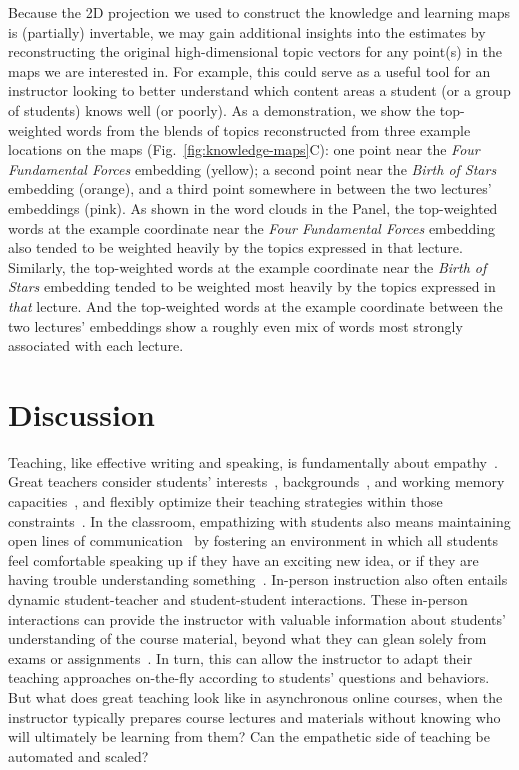 \documentclass[10pt]{article}
\begin{document}
Because the 2D projection we used to construct the knowledge and learning maps
is (partially) invertable, we may gain additional insights into the estimates
by reconstructing the original high-dimensional topic vectors for any point(s)
in the maps we are interested in. For example, this could serve as a useful
tool for an instructor looking to better understand which content areas a
student (or a group of students) knows well (or poorly). As a demonstration, we
show the top-weighted words from the blends of topics reconstructed from three
example locations on the maps (Fig.~\ref{fig:knowledge-maps}C): one point near
the \textit{Four Fundamental Forces} embedding (yellow); a second point near
the \textit{Birth of Stars} embedding (orange), and a third point somewhere in
between the two lectures' embeddings (pink). As shown in the word clouds in the
Panel, the top-weighted words at the example coordinate near the \textit{Four
Fundamental Forces} embedding also tended to be weighted heavily by the topics
expressed in that lecture. Similarly, the top-weighted words at the example
coordinate near the \textit{Birth of Stars} embedding tended to be weighted
most heavily by the topics expressed in \textit{that} lecture. And the
top-weighted words at the example coordinate between the two lectures'
embeddings show a roughly even mix of words most strongly associated with each
lecture.

\section*{Discussion}



Teaching, like effective writing and speaking, is fundamentally about
empathy~\citep{AldrEtal22, StojEtal12, MeyeEtal19}. Great teachers consider
students' interests~\citep{SwarEtal12, Clar10}, backgrounds~\citep{MuijReyn10,
Rose76, denBEtal10}, and working memory capacities~\citep{Allo12}, and flexibly
optimize their teaching strategies within those constraints~\citep{GoodEtal07,
AndeEtal21, John02}. In the classroom, empathizing with students also means
maintaining open lines of communication~\citep{WulfWulf10} by fostering an
environment in which all students feel comfortable speaking up if they have an
exciting new idea, or if they are having trouble understanding
something~\citep{TurnBrai15, GarrRasm14}. In-person instruction also often
entails dynamic student-teacher and student-student interactions. These
in-person interactions can provide the instructor with valuable information
about students' understanding of the course material, beyond what they can
glean solely from exams or assignments~\citep{Engl09, vandEtal10c, HallWals02}.
In turn, this can allow the instructor to adapt their teaching approaches
on-the-fly according to students' questions and behaviors. But what does great
teaching look like in asynchronous online courses, when the instructor
typically prepares course lectures and materials without knowing who will
ultimately be learning from them? Can the empathetic side of teaching be
automated and scaled?
\end{document}
